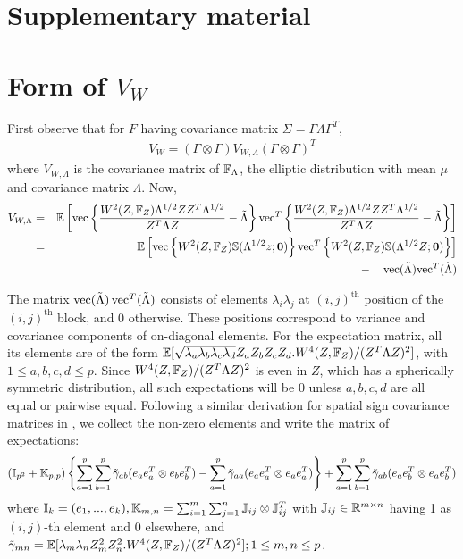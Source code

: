 \appendix
\section*{Supplementary material}
\renewcommand{\thesection}{\Alph{section}}
\section{Form of $V_W$}\label{sec:appA}
First observe that for $F$ having covariance matrix $\Sigma = \Gamma\Lambda\Gamma^T$,
%
\begin{align}\label{eqn:VWeqn}
V_W  = (\Gamma \otimes \Gamma) V_{W, \Lambda} (\Gamma \otimes \Gamma)^T
\end{align}
%
where $V_{W, \Lambda}$ is the covariance matrix of ${\mathbb{F}}_\Lambda$, the elliptic distribution with mean $\mu$ and covariance matrix $\Lambda$. Now,
%
\begin{eqnarray*}
V_{W, \Lambda} &=& {\mathbb{E}} \left[ \operatorname*{vec} \left\{ \frac{W^2 (Z, {\mathbb{F}}_Z) \Lambda^{1/2} ZZ^T \Lambda^{1/2} }{ Z^T \Lambda Z} - \tilde \Lambda \right\} {\operatorname*{vec}}^T \left\{ \frac{ W^2(Z, {\mathbb{F}}_Z) \Lambda^{1/2} ZZ^T \Lambda^{1/2} }{ Z^T \Lambda Z} - \tilde \Lambda \right\} \right]\\
&=& {\mathbb{E}} \left[ \operatorname*{vec} \left\{ W^2 (Z, {\mathbb{F}}_Z) {\mathbb{S}}( \Lambda^{1/2} z; {\bf 0} ) \right\} {\operatorname*{vec}}^T \left\{ W^2(Z, {\mathbb{F}}_Z) {\mathbb{S}}( \Lambda^{1/2}Z; \bf0) \right\} \right]\\
&& - \quad \operatorname*{vec}( \tilde \Lambda) {\operatorname*{vec}}^T( \tilde \Lambda )
\end{eqnarray*}

The matrix $\operatorname*{vec}( \tilde\Lambda) \operatorname*{vec}^T(\tilde\Lambda)$ consists of elements $\lambda_i\lambda_j$ at $(i,j)^\text{th}$ position of the $(i,j)^\text{th}$ block, and 0 otherwise. These positions correspond to variance and covariance components of on-diagonal elements. For the expectation matrix, all its elements are of the form $ {\mathbb{E}}[ \sqrt{\lambda_a \lambda_b \lambda_c \lambda_d} Z_a Z_b Z_c Z_d . W^4 (Z, {\mathbb{F}}_Z) / (Z^T \Lambda Z)^2]$, with $1 \leq a,b,c,d \leq p$. Since $W^4 (Z, {\mathbb{F}}_Z) / (Z^T \Lambda Z)^2$ is even in $Z$, which has a spherically symmetric distribution, all such expectations will be 0 unless $a,b,c,d$ are all equal or pairwise equal. Following a similar derivation for spatial sign covariance matrices in \cite{ref:Biometrika14673_MagyarTyler}, we collect the non-zero elements and write the matrix of expectations:
%
$$ ({\mathbb{I}}_{p^2} + {\mathbb{K}}_{p,p}) \left\{ \sum_{a=1}^p \sum_{b=1}^p \tilde\gamma_{ab} (e_a e_a^T \otimes  e_b e_b^T) - \sum_{a=1}^p \tilde\gamma_{aa} (e_a e_a^T \otimes  e_a e_a^T) \right\} + \sum_{a=1}^p \sum_{b=1}^p \tilde\gamma_{ab} (e_a e_b^T \otimes  e_a e_b^T) $$
%
where ${\mathbb{I}}_k = (e_1,...,e_k), {\mathbb{K}}_{m,n} = \sum_{i=1}^m \sum_{j=1}^n {\mathbb{J}}_{ij} \otimes {\mathbb{J}}_{ij}^T$ with ${\mathbb{J}}_{ij} \in {\mathbb{R}}^{m \times n}$ having 1 as $(i,j)$-th element and 0 elsewhere, and $\tilde\gamma_{mn} = {\mathbb{E}}[ \lambda_m \lambda_n Z_m^2 Z_n ^2 . W^4 (Z, {\mathbb{F}}_Z) / (Z^T \Lambda Z)^2]; 1 \leq m,n \leq p$.

